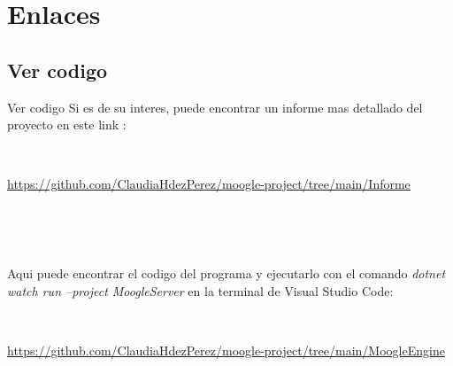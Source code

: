 \section{Enlaces}

\subsection{Ver codigo}
\begin{frame}{Ver codigo}
    Si es de su interes, puede encontrar un informe mas detallado del proyecto en este link :

    \

    \textcolor{blue}{\underline{\scriptsize {\url{https://github.com/ClaudiaHdezPerez/moogle-project/tree/main/Informe}}}}

    \

    \

    Aqui puede encontrar el codigo del programa y ejecutarlo con el comando \textit{dotnet watch run --project MoogleServer} en la terminal de Visual Studio Code:

    \

    \textcolor{blue}{\underline{\scriptsize {\url{https://github.com/ClaudiaHdezPerez/moogle-project/tree/main/MoogleEngine}}}}
\end{frame}